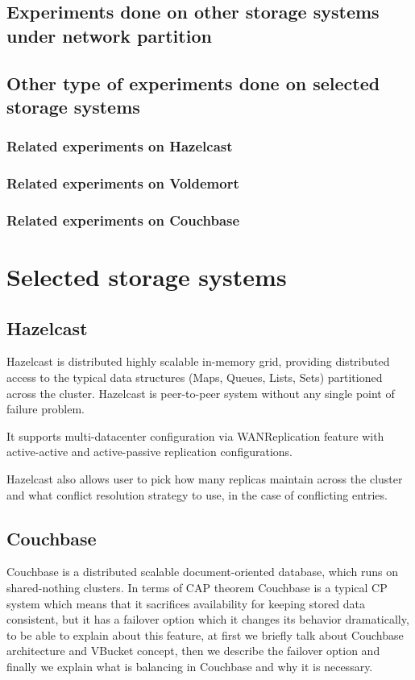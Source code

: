 \documentclass[a4paper]{article}
\begin{document}
\subsection{Experiments done on other storage systems under network partition}

\subsection{Other type of experiments done on selected storage systems}
\subsubsection*{Related experiments on Hazelcast}
\subsubsection*{Related experiments on Voldemort}
\subsubsection*{Related experiments on Couchbase}


\section{Selected storage systems}
\label{sec:candidates}

\subsection*{Hazelcast}
Hazelcast is distributed highly scalable in-memory grid, providing distributed access to the typical data structures (Maps, Queues, Lists, Sets) partitioned across the cluster. 
Hazelcast is peer-to-peer system without any single point of failure problem.

It supports multi-datacenter configuration via WANReplication feature with active-active and active-passive replication configurations.

Hazelcast also allows user to pick how many replicas maintain across the cluster and what conflict resolution strategy to use, in the case of conflicting entries.  

\subsection*{Couchbase}

Couchbase is a distributed scalable document-oriented database, which runs on shared-nothing clusters.
In terms of CAP theorem Couchbase is a typical CP system which means that it sacrifices availability for keeping stored data consistent, but it has a failover option which it changes its behavior dramatically, to be able to explain about this feature, at first we briefly talk about Couchbase architecture and VBucket concept, then we describe the failover option and finally we explain what is balancing in Couchbase and why it is necessary.
\end{document}
